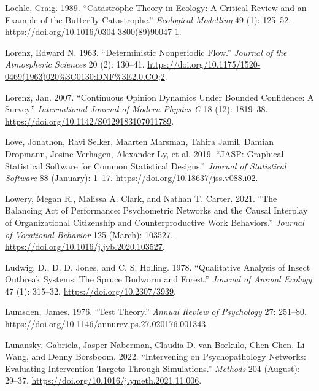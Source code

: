 \documentclass[
  a4paper,
  DIV=11,
  numbers=noendperiod,
  oneside]{scrreprt}
\newlength{\cslhangindent}
\newenvironment{CSLReferences}[2] %
 {\begin{list}{}{%
  \setlength{\itemindent}{0pt}
  \setlength{\leftmargin}{0pt}
  \setlength{\parsep}{0pt}
  \ifodd #1
   \setlength{\leftmargin}{\cslhangindent}
   \setlength{\itemindent}{-1\cslhangindent}
  \fi
  \setlength{\itemsep}{#2\baselineskip}}}
 {\end{list}}
\begin{document}
\begin{CSLReferences}{1}{0}
Loehle, Craig. 1989. {``Catastrophe Theory in Ecology: A Critical Review
and an Example of the Butterfly Catastrophe.''} \emph{Ecological
Modelling} 49 (1): 125--52.
\url{https://doi.org/10.1016/0304-3800(89)90047-1}.

Lorenz, Edward N. 1963. {``Deterministic {Nonperiodic Flow}.''}
\emph{Journal of the Atmospheric Sciences} 20 (2): 130--41.
\url{https://doi.org/10.1175/1520-0469(1963)020\%3C0130:DNF\%3E2.0.CO;2}.

Lorenz, Jan. 2007. {``Continuous Opinion Dynamics Under Bounded
Confidence: A Survey.''} \emph{International Journal of Modern Physics
C} 18 (12): 1819--38. \url{https://doi.org/10.1142/S0129183107011789}.

Love, Jonathon, Ravi Selker, Maarten Marsman, Tahira Jamil, Damian
Dropmann, Josine Verhagen, Alexander Ly, et al. 2019. {``{JASP}:
{Graphical Statistical Software} for {Common Statistical Designs}.''}
\emph{Journal of Statistical Software} 88 (January): 1--17.
\url{https://doi.org/10.18637/jss.v088.i02}.

Lowery, Megan R., Malissa A. Clark, and Nathan T. Carter. 2021. {``The
Balancing Act of Performance: {Psychometric} Networks and the Causal
Interplay of Organizational Citizenship and Counterproductive Work
Behaviors.''} \emph{Journal of Vocational Behavior} 125 (March): 103527.
\url{https://doi.org/10.1016/j.jvb.2020.103527}.

Ludwig, D., D. D. Jones, and C. S. Holling. 1978. {``Qualitative
Analysis of Insect Outbreak Systems: The Spruce Budworm and Forest.''}
\emph{Journal of Animal Ecology} 47 (1): 315--32.
\url{https://doi.org/10.2307/3939}.

Lumsden, James. 1976. {``Test Theory.''} \emph{Annual Review of
Psychology} 27: 251--80.
\url{https://doi.org/10.1146/annurev.ps.27.020176.001343}.

Lunansky, Gabriela, Jasper Naberman, Claudia D. van Borkulo, Chen Chen,
Li Wang, and Denny Borsboom. 2022. {``Intervening on Psychopathology
Networks: {Evaluating} Intervention Targets Through Simulations.''}
\emph{Methods} 204 (August): 29--37.
\url{https://doi.org/10.1016/j.ymeth.2021.11.006}.


\end{CSLReferences}
\end{document}
